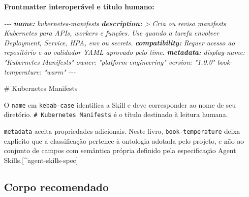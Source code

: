 \documentclass[
  10pt,
  a4paper,
  oneside]{book}
\newenvironment{Shaded}{}{}
\newcommand{\AnnotationTok}[1]{\textcolor[rgb]{0.38,0.63,0.69}{\textbf{\textit{#1}}}}
\newcommand{\CommentTok}[1]{\textcolor[rgb]{0.38,0.63,0.69}{\textit{#1}}}
\newcommand{\FunctionTok}[1]{\textcolor[rgb]{0.02,0.16,0.49}{#1}}
\renewenvironment{Shaded}{\begin{snugshade}}{\end{snugshade}}%
\begin{document}
\textbf{Frontmatter interoperável e título humano:}

\begin{Shaded}
\begin{Highlighting}[]
\CommentTok{{-}{-}{-}}
\AnnotationTok{name:}\CommentTok{ kubernetes{-}manifests}
\AnnotationTok{description:}\CommentTok{ \textgreater{}}
\CommentTok{  Cria ou revisa manifests Kubernetes para APIs, workers e funções.}
\CommentTok{  Use quando a tarefa envolver Deployment, Service, HPA, env ou secrets.}
\AnnotationTok{compatibility:}\CommentTok{ Requer acesso ao repositório e ao validador YAML aprovado pelo time.}
\AnnotationTok{metadata:}
\CommentTok{  display{-}name: "Kubernetes Manifests"}
\CommentTok{  owner: "platform{-}engineering"}
\CommentTok{  version: "1.0.0"}
\CommentTok{  book{-}temperature: "warm"}
\CommentTok{{-}{-}{-}}

\FunctionTok{\# Kubernetes Manifests}
\end{Highlighting}
\end{Shaded}

O \texttt{name} em \texttt{kebab-case} identifica a Skill e deve
corresponder ao nome de seu diretório.
\texttt{\#\ Kubernetes\ Manifests} é o título destinado à leitura
humana.

\texttt{metadata} aceita propriedades adicionais. Neste livro,
\texttt{book-temperature} deixa explícito que a classificação pertence à
ontologia adotada pelo projeto, e não ao conjunto de campos com
semântica própria definido pela especificação Agent
Skills.{[}\^{}agent-skills-spec{]}

\hypertarget{corpo-recomendado}{%
\subsection{Corpo recomendado}\label{corpo-recomendado}}
\end{document}
